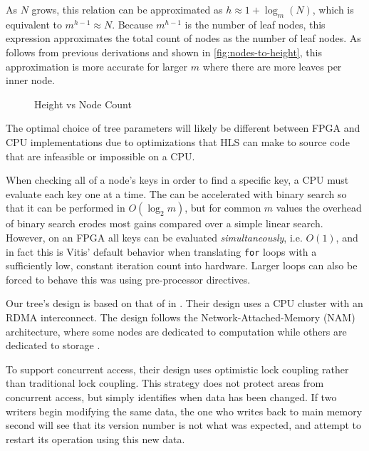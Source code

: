 As $N$ grows, this relation can be approximated as $h \approx 1 + \log_m(N)$,
which is equivalent to  $m^{h-1} \approx N$. Because $m^{h-1}$ is the number of
leaf nodes, this expression approximates the total count of nodes as the number
of leaf nodes. As follows from previous derivations and shown in
\autoref{fig:nodes-to-height}, this approximation is more accurate for larger
$m$ where there are more leaves per inner node.

\begin{figure}[H]
	\centering
	
	\caption{Height vs Node Count}
	\label{fig:nodes-to-height}
\end{figure}



The optimal choice of tree parameters will likely be different between FPGA and
CPU implementations due to optimizations that HLS can make to source code that
are infeasible or impossible on a CPU.

When checking all of a node's keys in order to find a specific key, a CPU must
evaluate each key one at a time. The can be accelerated with binary search so
that it can be performed in $O(\log_2 m)$, but for common $m$ values the
overhead of binary search erodes most gains compared over a simple linear
search. However, on an FPGA all keys can be evaluated \emph{simultaneously},
i.e. $O(1)$, and in fact this is Vitis' default behavior when translating
\texttt{for} loops with a sufficiently low, constant iteration count into
hardware. Larger loops can also be forced to behave this was using pre-processor
directives.



\label{subsec:concurrency}

Our tree's design is based on that of \citeauthor{base} in .
Their design uses a CPU cluster with an RDMA interconnect. The design follows
the Network-Attached-Memory (NAM) architecture, where some nodes are dedicated
to computation while others are dedicated to storage
\autocite{base,binnig-vldb-2016}.

To support concurrent access, their design uses optimistic lock coupling rather
than traditional lock coupling. This strategy does not protect areas from
concurrent access, but simply identifies when data has been changed. If two
writers begin modifying the same data, the one who writes back to main memory
second will see that its version number is not what was expected, and attempt to
restart its operation using this new data.

